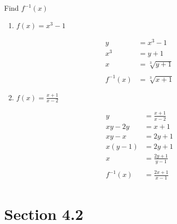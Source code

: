 \documentclass{exam}
\begin{document}
  Find $f^{-1}(x)$

  \begin{enumerate}

    \item $f(x) = x^3 - 1$ 
      \begin{solution}
        \begin{align*}
          y   &= x^3 - 1 \\
          x^3 &= y + 1 \\
          x   &= \sqrt[3]{y + 1} \\
          \\
          f^{-1}(x) &= \sqrt[3]{x + 1}
        \end{align*}
      \end{solution}

    \ifprintanswers
      \pagebreak
    \fi

    \item $f(x) = \frac{x + 1}{x - 2}$
      \begin{solution}
        \begin{align*}
          y        &= \frac{x + 1}{x - 2} \\
          xy - 2y  &= x + 1 \\
          xy - x   &= 2y + 1 \\
          x(y - 1) &= 2y + 1 \\
          x        &= \frac{2y + 1}{y - 1} \\
          \\
          f^{-1}(x) &= \frac{2x + 1}{x - 1} \\
        \end{align*}
      \end{solution}

  \end{enumerate}

  \ifprintanswers
    \section{Section 4.2}
\end{document}
